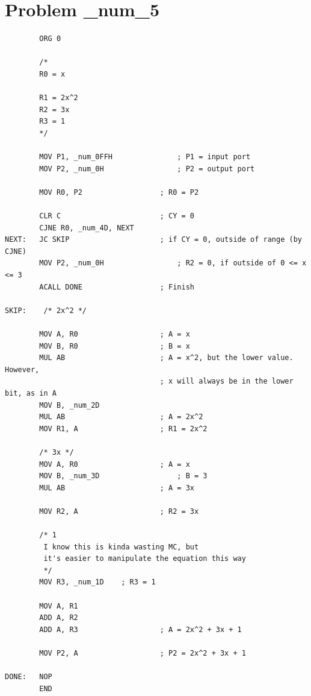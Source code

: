 \documentclass[12pt]{article}
\begin{document}
\section{Problem \_num_5}
\begin{verbatim}
        ORG 0

        /*
        R0 = x

        R1 = 2x^2
        R2 = 3x
        R3 = 1
        */

        MOV P1, _num_0FFH               ; P1 = input port
        MOV P2, _num_0H                 ; P2 = output port

        MOV R0, P2                  ; R0 = P2

        CLR C                       ; CY = 0
        CJNE R0, _num_4D, NEXT
NEXT:   JC SKIP                     ; if CY = 0, outside of range (by CJNE)
        MOV P2, _num_0H                 ; R2 = 0, if outside of 0 <= x <= 3
        ACALL DONE                  ; Finish

SKIP:    /* 2x^2 */

        MOV A, R0                   ; A = x
        MOV B, R0                   ; B = x
        MUL AB                      ; A = x^2, but the lower value. However,
                                    ; x will always be in the lower bit, as in A
        MOV B, _num_2D
        MUL AB                      ; A = 2x^2
        MOV R1, A                   ; R1 = 2x^2

        /* 3x */
        MOV A, R0                   ; A = x
        MOV B, _num_3D                  ; B = 3
        MUL AB                      ; A = 3x

        MOV R2, A                   ; R2 = 3x

        /* 1
         I know this is kinda wasting MC, but
         it's easier to manipulate the equation this way
         */
        MOV R3, _num_1D    ; R3 = 1

        MOV A, R1
        ADD A, R2
        ADD A, R3                   ; A = 2x^2 + 3x + 1

        MOV P2, A                   ; P2 = 2x^2 + 3x + 1

DONE:   NOP
        END
\end{verbatim}
\end{document}
